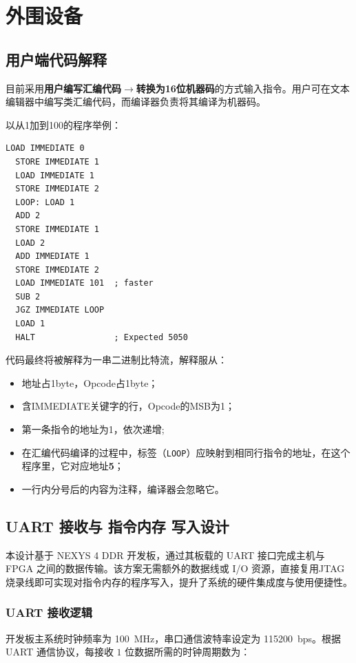 \documentclass[lang=cn,a4paper,newtx]{elegantpaper}
\begin{document}
\section{外围设备}
\subsection{用户端代码解释}\label{sec:UserCode}
目前采用\textbf{用户编写汇编代码}$\to$\textbf{转换为16位机器码}的方式输入指令。用户可在文本编辑器中编写类汇编代码，而编译器负责将其编译为机器码。

以从1加到100的程序举例：
\begin{lstlisting}[language=Assembly]
  LOAD IMMEDIATE 0
  STORE IMMEDIATE 1
  LOAD IMMEDIATE 1
  STORE IMMEDIATE 2
  LOOP: LOAD 1
  ADD 2
  STORE IMMEDIATE 1
  LOAD 2
  ADD IMMEDIATE 1
  STORE IMMEDIATE 2
  LOAD IMMEDIATE 101  ; faster
  SUB 2
  JGZ IMMEDIATE LOOP
  LOAD 1
  HALT                ; Expected 5050
\end{lstlisting}

代码最终将被解释为一串二进制比特流，解释服从：
\begin{itemize}
  \item 地址占1byte，Opcode占1byte；
  \item 含IMMEDIATE关键字的行，Opcode的MSB为1；
  \item 第一条指令的地址为1，依次递增;
  \item 在汇编代码编译的过程中，标签（\texttt{LOOP}）应映射到相同行指令的地址，在这个程序里，它对应地址\textbf{5}；
  \item 一行内分号后的内容为注释，编译器会忽略它。
\end{itemize}



\subsection{UART 接收与 指令内存 写入设计}

本设计基于 NEXYS 4 DDR 开发板，通过其板载的 UART 接口完成主机与 FPGA 之间的数据传输。该方案无需额外的数据线或 I/O 资源，直接复用JTAG烧录线即可实现对指令内存的程序写入，提升了系统的硬件集成度与使用便捷性。

\subsubsection{UART 接收逻辑}

开发板主系统时钟频率为 \SI{100}{\mega\hertz}，串口通信波特率设定为 \SI{115200}{bps}。根据 UART 通信协议，每接收 $1$ 位数据所需的时钟周期数为：
\end{document}
